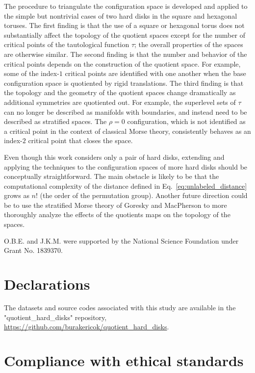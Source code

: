 \documentclass[default,iicol]{sn-jnl}%
\theoremstyle{thmstyleone}%
\theoremstyle{thmstyletwo}%
\theoremstyle{thmstylethree}%
\begin{document}
The procedure to triangulate the configuration space is developed and applied to the simple but nontrivial cases of two hard disks in the square and hexagonal toruses. The first finding is that the use of a square or hexagonal torus does not substantially affect the topology of the quotient spaces except for the number of critical points of the tautological function $\tau$; the overall properties of the spaces are otherwise similar. The second finding is that the number and behavior of the critical points depends on the construction of the quotient space. For example, some of the index-$1$ critical points are identified with one another when the base configuration space is quotiented by rigid translations. The third finding is that the topology and the geometry of the quotient spaces change dramatically as additional symmetries are quotiented out. For example, the superlevel sets of $\tau$ can no longer be described as manifolds with boundaries, and instead need to be described as stratified spaces. The $\rho = 0$ configuration, which is not identified as a critical point in the context of classical Morse theory, consistently behaves as an index-$2$ critical point that closes the space.

Even though this work considers only a pair of hard disks, extending and applying the techniques to the configuration spaces of more hard disks should be conceptually straightforward. The main obstacle is likely to be that the computational complexity of the distance defined in Eq.\ \ref{eq:unlabeled_distance} grows as $n!$ (the order of the permutation group). Another future direction could be to use the stratified Morse theory of Goresky and MacPherson \cite{goresky1988stratified} to more thoroughly analyze the effects of the quotients maps on the topology of the spaces.

\backmatter
{} O.B.E. and J.K.M. were  supported  by  the  National  Science  Foundation under Grant No. 1839370.

\section*{Declarations}

 The datasets and source codes associated with this study are available in the "quotient\_hard\_disks" repository, \url{https://github.com/burakericok/quotient_hard_disks}.

\section*{Compliance with ethical standards}
\end{document}
